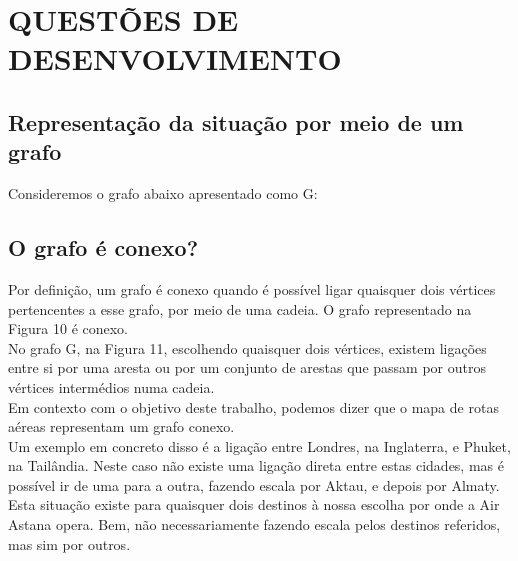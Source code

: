 \section{QUESTÕES DE DESENVOLVIMENTO}
\label{section}
\subsection{Representação da situação por meio de um grafo}
Consideremos o grafo abaixo apresentado como G:\\
\subsection{ O grafo é conexo?}
\indent Por definição, um grafo é conexo quando é possível ligar quaisquer dois vértices pertencentes a esse grafo, por meio de uma cadeia. O grafo representado na Figura 10 é conexo.\\
\indent No grafo G, na Figura 11, escolhendo quaisquer dois vértices, existem ligações entre si por uma aresta ou por um conjunto de arestas que passam por outros vértices intermédios numa cadeia.\\
\indent Em contexto com o objetivo deste trabalho, podemos dizer que o mapa de rotas aéreas representam um 
grafo conexo.\\
\indent Um exemplo em concreto disso é a ligação entre Londres, na Inglaterra, e Phuket, na Tailândia. Neste 
caso não existe uma ligação direta entre estas cidades, mas é possível ir de uma para a outra, fazendo escala 
por Aktau, e depois por Almaty. Esta situação existe para quaisquer dois destinos à nossa escolha por onde a 
Air Astana opera. Bem, não necessariamente fazendo escala pelos destinos referidos, mas sim por outros.\\
